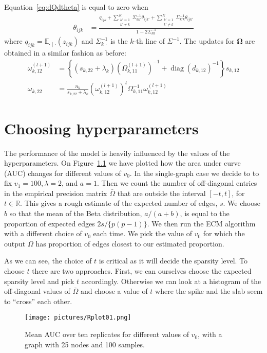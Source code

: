 \documentclass[a4paper, 11pt, oneside]{report}
\DeclareMathOperator{\diag}{diag}
\newcommand{\R}{\mathbb{R}}
\newcommand{\E}{\mathbb{E}}
\newcommand{\1}{\mathds{1}}
\newcommand{\inv}{^{-1}}
\newcommand{\bOmega}{\mathbf{\Omega}}
\begin{document}
Equation~\eqref{eq:dQdtheta} is equal to
zero when
\begin{align*}
	\theta_{ijk} & = \frac{q_{ijk} + \sum_{\substack{k' = 1 \\ k' \neq k}}^K \Sigma_{k k'}\inv \theta_{ijk'} + \sum_{\substack{k' = 1 \\ k' \neq k}}^K \Sigma_{k' k}\inv \theta_{ijk'}}{1 - 2 \Sigma_{kk}\inv}
\end{align*}
where $q_{ijk} = \E_{\cdot \mid \cdot}(z_{ijk})$ and $\Sigma_{k \, \cdot}\inv$ is
the $k$-th line of $\Sigma\inv$.
The updates for $\bOmega$ are obtained in a similar fashion as before:
\begin{align*}
	\omega_{k,12}^{(l+1)} & = \left\{(s_{k, 22} + \lambda_k) \left(\Omega_{k, 11}^{(l+1)}\right)\inv + \diag(d_{k, 12})\inv\right\} s_{k, 12} \\
	\omega_{k, 22}        & = \frac{n_k}{s_{k,22} + \lambda_k} \left(\omega_{k,12}^{(l+1)}\right)^t \Omega_{k, 11}\inv \omega_{k, 12}^{(l+1)}
\end{align*}

\chapter{Choosing hyperparameters}
The performance of the model is heavily influenced by the values of the
hyperparameters. On Figure~\ref{fig:mean_auc} we have plotted how the area
under curve (AUC) changes for different values of $v_0$. In the single-graph
case we decide to to fix $v_1 = 100,
	\lambda = 2$, and $a = 1$. Then we count the number of off-diagonal entries in
the empirical precision matrix $\bar \Omega$ that are outside the interval
$[-t, t]$, for $t \in \R$. This gives a rough estimate of the expected number
of edges, $s$. We choose $b$ so that the mean of the Beta distribution,
$a/(a+b)$, is equal to the proportion of expected edges $2s/\{p(p-1)\}$. We then
run the ECM algorithm with a different choice of $v_0$ each time. We pick the
value of $v_0$ for which the output $\Omega$ has proportion of edges closest to
our estimated proportion.

As we can see, the choice of $t$ is critical as it will decide the sparsity level.
To choose $t$ there are two approaches. First, we can ourselves choose the
expected sparsity level and pick $t$ accordingly. Otherwise we can look at a
histogram of the off-diagonal values of $\bar \Omega$ and choose a value of $t$
where the spike and the slab seem to ``cross'' each other.

\begin{figure}
	\centering
	\texttt{[image: pictures/Rplot01.png]}
	\caption{Mean AUC over ten replicates for different values of $v_0$, with a
		graph with 25 nodes and 100 samples.}\label{fig:mean_auc}
\end{figure}
\end{document}
